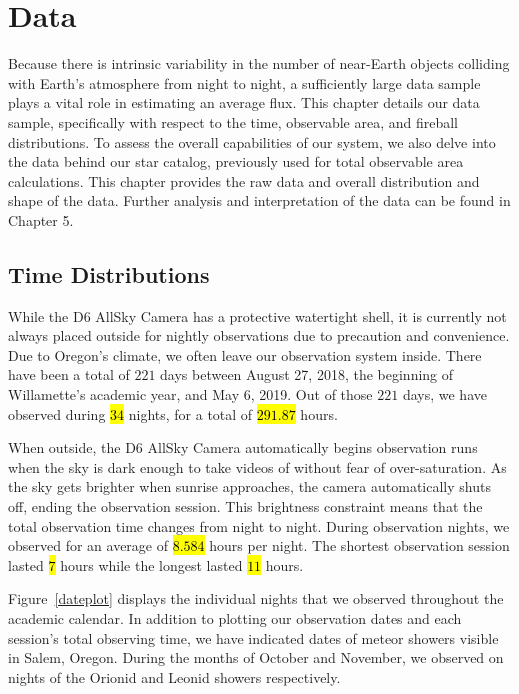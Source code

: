 \chapter{Data}

Because there is intrinsic variability in the number of near-Earth objects colliding with Earth's atmosphere from night to night, a sufficiently large data sample plays a vital role in estimating an average flux.
This chapter details our data sample, specifically with respect to the time, observable area, and fireball distributions.  
To assess the overall capabilities of our system, we also delve into the data behind our star catalog, previously used for total observable area calculations.  
This chapter provides the raw data and overall distribution and shape of the data. Further analysis and interpretation of the data can be found in Chapter 5.

\section{Time Distributions}

While the D6 AllSky Camera has a protective watertight shell, it is currently not always placed outside for nightly observations due to precaution and convenience.
Due to Oregon's climate, we often leave our observation system inside.
There have been a total of $221$ days between August 27, 2018, the beginning of Willamette's academic year, and May 6, 2019.
Out of those $221$ days, we have observed during \hl{$34$} nights, for a total of \hl{$291.87$} hours.

When outside, the D6 AllSky Camera automatically begins observation runs when the sky is dark enough to take videos of without fear of over-saturation.
As the sky gets brighter when sunrise approaches, the camera automatically shuts off, ending the observation session.
This brightness constraint means that the total observation time changes from night to night.
During observation nights, we observed for an average of \hl{$8.584$} hours per night.
The shortest observation session lasted \hl{$7$} hours while the longest lasted \hl{$11$} hours.

Figure~\ref{dateplot} displays the individual nights that we observed throughout the academic calendar. 
In addition to plotting our observation dates and each session's total observing time, we have indicated dates of meteor showers visible in Salem, Oregon.  
During the months of October and November, we observed on nights of the Orionid and Leonid showers respectively.  


